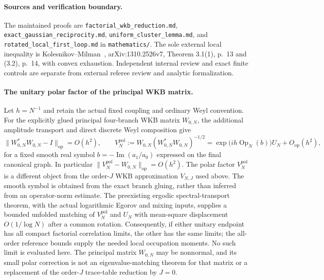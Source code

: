 \paragraph{Sources and verification boundary.}
The maintained proofs are \texttt{factorial\_\allowbreak{}wkb\_\allowbreak{}reduction.md},
\texttt{exact\_\allowbreak{}gaussian\_\allowbreak{}reciprocity.md}, \texttt{uniform\_\allowbreak{}cluster\_\allowbreak{}lemma.md},
and \texttt{rotated\_\allowbreak{}local\_\allowbreak{}first\_\allowbreak{}loop.md} in \texttt{mathematics/}.
The sole external local inequality is Kolesnikov--Milman~\cite{KolesnikovMilman2017},
arXiv:1310.2526v7, Theorem 3.1(1), p.~13 and (3.2), p.~14, with convex
exhaustion. Independent internal review and exact finite controls are
separate from external referee review and analytic formalization.

\paragraph{The unitary polar factor of the principal WKB matrix.}
Let $h=N^{-1}$ and retain the actual fixed coupling and ordinary Weyl
convention.  For the explicitly glued principal four-branch WKB matrix
$W_{0,N}$, the additional amplitude transport and direct discrete Weyl
composition give
\[
 \|W_{0,N}^{*}W_{0,N}-I\|_{\mathrm{op}}=O(h^2),\qquad
 V_N^{\mathrm{pol}}:=W_{0,N}(W_{0,N}^{*}W_{0,N})^{-1/2}
     =\exp\!\bigl(ih\operatorname{Op}_N(b)\bigr)U_N+O_{\mathrm{op}}(h^2),
\]
for a fixed smooth real symbol $b=-\operatorname{Im}(a_1/a_0)$ expressed on
the final canonical graph.  In particular $\|V_N^{\mathrm{pol}}-W_{0,N}\|_{\mathrm{op}}=O(h^2)$. The polar factor $V_N^{\mathrm{pol}}$ is a different object from the order-$J$ WKB approximation $V_{N,J}$ used above.
The smooth symbol is obtained from the exact branch gluing, rather than
inferred from an operator-norm estimate.  The preexisting ergodic
spectral-transport theorem, with the actual logarithmic Egorov and mixing
inputs, supplies a bounded unfolded matching of $V_N^{\mathrm{pol}}$ and $U_N$ with
mean-square displacement $O(1/\log N)$ after a common rotation.  Consequently,
if either unitary endpoint has all compact factorial correlation limits, the
other has the same limits; the all-order reference bounds supply the needed
local occupation moments.  No such limit is evaluated here.  The principal
matrix $W_{0,N}$ may be nonnormal, and its small polar correction is not an
eigenvalue-matching theorem for that matrix or a replacement of the
order-$J$ trace-table reduction by $J=0$.
